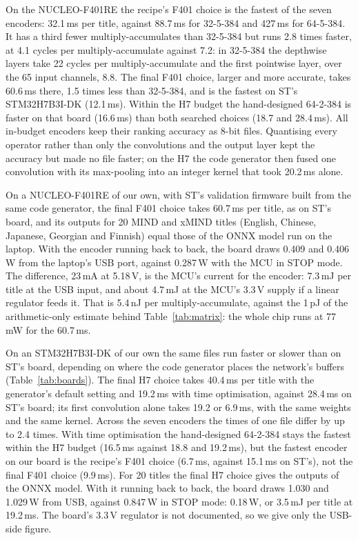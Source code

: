 \documentclass{llncs}
\begin{document}
On the NUCLEO-F401RE the recipe's F401 choice is the fastest of the seven
encoders: 32.1\,ms per title, against 88.7\,ms for 32-5-384 and 427\,ms for
64-5-384. It has a third fewer multiply-accumulates than 32-5-384 but runs 2.8
times faster, at 4.1 cycles per multiply-accumulate against 7.2: in 32-5-384 the
depthwise layers take 22 cycles per multiply-accumulate and the first pointwise
layer, over the 65 input channels, 8.8. The final F401 choice, larger and more
accurate, takes 60.6\,ms there, 1.5 times less than 32-5-384, and is the fastest
on ST's STM32H7B3I-DK (12.1\,ms). Within the H7 budget the hand-designed 64-2-384
is faster on that board (16.6\,ms) than both searched choices (18.7 and
28.4\,ms). All in-budget encoders keep their ranking accuracy as 8-bit files. Quantising every
operator rather than only the convolutions and the output layer kept the accuracy
but made no file faster; on the H7 the code generator then fused one convolution
with its max-pooling into an integer kernel that took 20.2\,ms alone.

On a NUCLEO-F401RE of our own, with ST's validation firmware built from the
same code generator, the final F401 choice takes 60.7\,ms per title, as on ST's
board, and its outputs for 20 MIND and xMIND titles (English, Chinese, Japanese,
Georgian and Finnish) equal those of the ONNX model run on the laptop. With the encoder running back to back, the
board draws 0.409 and 0.406\,W from the laptop's USB port, against 0.287\,W with
the MCU in STOP mode. The difference, 23\,mA at 5.18\,V, is the MCU's current
for the encoder: 7.3\,mJ per title at the USB input, and about 4.7\,mJ at the
MCU's 3.3\,V supply if a linear regulator feeds it. That is 5.4\,nJ per
multiply-accumulate, against the 1\,pJ of the arithmetic-only estimate behind
Table~\ref{tab:matrix}: the whole chip runs at 77\,mW for the 60.7\,ms.


On an STM32H7B3I-DK of our own the same files run faster or slower than on
ST's board, depending on where the code generator places the network's buffers
(Table~\ref{tab:boards}). The final H7 choice takes 40.4\,ms per title with the
generator's default setting and 19.2\,ms with time optimisation, against
28.4\,ms on ST's board; its first convolution alone takes 19.2 or 6.9\,ms, with
the same weights and the same kernel. Across the seven encoders the times of one
file differ by up to 2.4 times. With time optimisation the hand-designed 64-2-384
stays the fastest within the H7 budget (16.5\,ms against 18.8 and 19.2\,ms), but
the fastest encoder on our board is the recipe's F401 choice (6.7\,ms, against
15.1\,ms on ST's), not the final F401 choice (9.9\,ms). For 20 titles the final H7
choice gives the outputs of the ONNX model. With it running back to back, the
board draws 1.030 and 1.029\,W from USB, against 0.847\,W in STOP mode: 0.18\,W,
or 3.5\,mJ per title at 19.2\,ms. The board's 3.3\,V regulator is not documented,
so we give only the USB-side figure.
\end{document}
